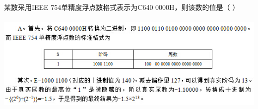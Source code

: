 \question 某数采用IEEE 754单精度浮点数格式表示为C640 0000H，则该数的值是（ ）
\par\fourch{\textcolor{red}{}}{}{}{}
\begin{solution}\includegraphics[width=5.67708in,height=1.87500in]{computerassets/b0063848a08156375605b5665c095cf8.jpeg}
\end{solution}
